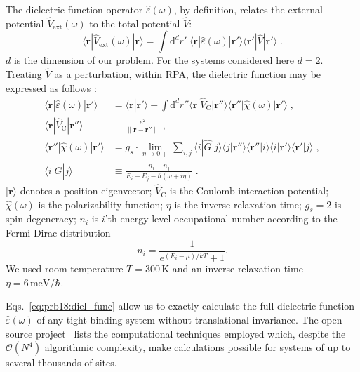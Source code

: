 The dielectric function operator $\hat\varepsilon(\omega)$, by definition, relates the external potential $\hat V_\text{ext}(\omega)$ to the total potential $\hat V$:
\begin{equation}
    \langle\mathbf{r}| \hat V_\text{ext}(\omega) |\mathbf{r}\rangle
        = \int\!\! \text{d}^d r' \; \langle\mathbf{r}| \hat\varepsilon(\omega)
            |\mathbf{r'}\rangle \langle\mathbf{r'}| \hat V |\mathbf{r'}\rangle
    \;.
\end{equation}
$d$ is the dimension of our problem. For the systems considered here $d = 2$. Treating $\hat V$ as a perturbation, within RPA, the dielectric function may be expressed as follows \cite{Vonsov2012QuantumSolidS}:
\begin{equation}\label{eq:prb18:diel_func}
\begin{aligned}
    \langle\mathbf{r}| \hat\varepsilon(\omega) |\mathbf{r'}\rangle
        &= \langle\mathbf{r}|\mathbf{r'}\rangle
        \!-\!\!\!
        \int\!\! \text{d}^d r'' \langle\mathbf{r}| \hat V_\text{C}
            |\mathbf{r''}\rangle \langle\mathbf{r''}| \hat\chi(\omega)
            |\mathbf{r'}\rangle \;, \\
    \langle\mathbf{r}| \hat V_\text{C} |\mathbf{r''}\rangle
        &\equiv \frac{e^2}{\|\mathbf{r} - \mathbf{r''}\|} \;, \\
    \langle\mathbf{r''}| \hat\chi(\omega) |\mathbf{r'}\rangle
    &= g_s \cdot\! \lim_{\eta \to 0+} \sum_{i,j}
            \langle i| \hat G |j\rangle
            \langle j|\mathbf{r''}\rangle \langle\mathbf{r''} |i\rangle
            \langle i|\mathbf{r'}\rangle \langle\mathbf{r'} |j\rangle \;, \\
    \langle i| \hat G |j\rangle
        &\equiv \frac{n_i - n_j}{E_i - E_j - \hbar(\omega + i\eta)} \;.
\end{aligned}
\end{equation}
$|\mathbf{r}\rangle$ denotes a position eigenvector; $\hat V_\text{C}$ is the Coulomb interaction potential; $\hat\chi(\omega)$ is the polarizability function; $\eta$ is the inverse relaxation time; $g_s = 2$ is spin degeneracy; $n_i$ is $i$'th energy level occupational number according to the Fermi-Dirac distribution
\begin{equation}
    n_i = \frac{1}{e^{(E_i - \mu)/kT} + 1}.
\end{equation}
We used room temperature $T=300\,\text{K}$ and an inverse relaxation time $\eta = 6\,\text{meV/}\hbar$.

Eqs.~\eqref{eq:prb18:diel_func} allow us to exactly calculate the full dielectric function $\hat\varepsilon(\omega)$ of any tight-binding system without translational invariance. The open source project~\cite{Westerhout2017} lists the computational techniques employed which, despite the $\mathcal{O}(N^4)$ algorithmic complexity, make calculations possible for systems of up to several thousands of sites.


